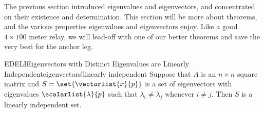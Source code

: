 %
The previous section introduced eigenvalues and eigenvectors, and concentrated on their existence and determination.  This section will be more about theorems, and the various properties eigenvalues and eigenvectors enjoy.  Like a good $4\times 100\text{ meter}$ relay, we will lead-off with one of our better theorems and save the very best for the anchor leg.
%
\begin{theorem}{EDELI}{Eigenvectors with Distinct Eigenvalues are Linearly Independent}{eigenvectors!linearly independent}
Suppose that $A$ is an $n\times n$ square matrix and $S=\set{\vectorlist{x}{p}}$ is a set of eigenvectors with eigenvalues $\scalarlist{\lambda}{p}$ such that $\lambda_i\neq\lambda_j$ whenever $i\neq j$.  Then $S$ is a linearly independent set.
\end{theorem}
%
